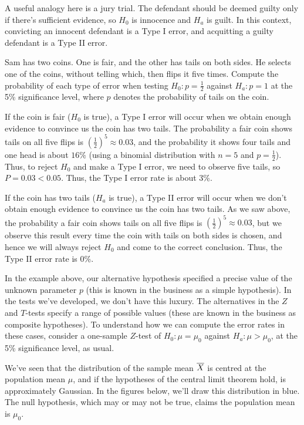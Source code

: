 \begin{remark}
A useful analogy here is a jury trial. The defendant should be deemed guilty only if there's sufficient evidence, so $H_0$ is innocence and $H_a$ is guilt. In this context, convicting an innocent defendant is a Type I error, and acquitting a guilty defendant is a Type II error.
\end{remark}

\begin{example}
Sam has two coins. One is fair, and the other has tails on both sides. He selects one of the coins, without telling which, then flips it five times. Compute the probability of each type of error when testing $H_0: p = \frac{1}{2}$ against $H_a: p = 1$ at the 5\% significance level, where $p$ denotes the probability of tails on the coin.

If the coin is fair ($H_0$ is true), a Type I error will occur when we obtain enough evidence to convince us the coin has two tails. The probability a fair coin shows tails on all five flips is $(\frac{1}{2})^5 \approx 0.03$, and the probability it shows four tails and one head is about $16\%$ (using a binomial distribution with $n=5$ and $p=\frac{1}{2}$). Thus, to reject $H_0$ and make a Type I error, we need to observe five tails, so $P = 0.03 < 0.05$. Thus, the Type I error rate is about 3\%.

If the coin has two tails ($H_a$ is true), a Type II error will occur when we don't obtain enough evidence to convince us the coin has two tails. As we saw above, the probability a fair coin shows tails on all five flips is $(\frac{1}{2})^5 \approx 0.03$, but we observe this result every time the coin with tails on both sides is chosen, and hence we will always reject $H_0$ and come to the correct conclusion. Thus, the Type II error rate is 0\%.
\end{example}

In the example above, our alternative hypothesis specified a precise value of the unknown parameter $p$ (this is known in the business as a simple hypothesis). In the tests we've developed, we don't have this luxury. The alternatives in the $Z$ and $T$-tests specify a range of possible values (these are known in the business as composite hypotheses). To understand how we can compute the error rates in these cases, consider a one-sample $Z$-test of $H_0: \mu = \mu_0$ against $H_a: \mu > \mu_0$, at the 5\% significance level, as usual.

We've seen that the distribution of the sample mean ${\overline{X}}$ is centred at the population mean $\mu$, and if the hypotheses of the central limit theorem hold, is approximately Gaussian. In the figures below, we'll draw this distribution in blue. The null hypothesis, which may or may not be true, claims the population mean is $\mu_0$.

